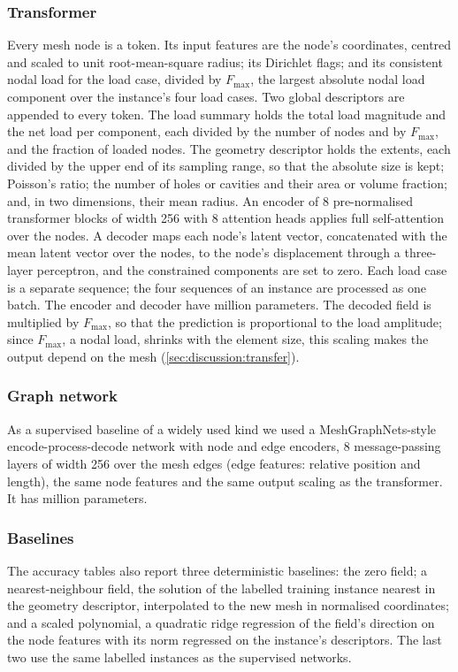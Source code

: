 \subsubsection{Transformer}
Every mesh node is a token. Its input features are the node's coordinates, centred and
scaled to unit root-mean-square radius; its Dirichlet flags; and its consistent nodal load
for the load case, divided by $F_{\max}$, the largest absolute nodal load component over the
instance's four load cases. Two global descriptors are appended to every token. The load summary holds the total load
magnitude and the net load per component, each divided by the number of nodes and by
$F_{\max}$, and the fraction of loaded nodes. The geometry descriptor holds the extents, each
divided by the upper end of its sampling range, so that the absolute size is kept; Poisson's
ratio; the number of holes or cavities and their area or volume fraction; and, in two
dimensions, their mean radius. An encoder of 8 pre-normalised transformer blocks
\cite{Vaswani2017} of width 256 with 8 attention heads applies full self-attention over the nodes. A decoder maps each node's latent vector, concatenated with the mean latent vector
over the nodes, to the node's displacement through a three-layer perceptron, and the
constrained components are set to zero. Each load case is a separate sequence; the four
sequences of an instance are processed as one batch. The encoder and decoder have
\numParamsTransformer{} million parameters. The decoded field is multiplied by $F_{\max}$,
so that the prediction is proportional to the load amplitude; since $F_{\max}$, a nodal
load, shrinks with the element size, this scaling makes the output depend on the mesh
(\cref{sec:discussion:transfer}).

\subsubsection{Graph network}
As a supervised baseline of a widely used kind we used a MeshGraphNets-style
encode-process-decode network \cite{Pfaff2021} with node and edge encoders, 8
message-passing layers of width 256 over the mesh edges (edge features: relative position
and length), the same node features and the same output scaling as the transformer. It has \numParamsGraph{} million parameters.

\subsubsection{Baselines}
The accuracy tables also report three deterministic baselines: the zero field; a
nearest-neighbour field, the solution of the labelled training instance nearest in the
geometry descriptor, interpolated to the new mesh in normalised coordinates; and a scaled
polynomial, a quadratic ridge regression of the field's direction on the node features with
its norm regressed on the instance's descriptors. The last two use the same labelled
instances as the supervised networks.

